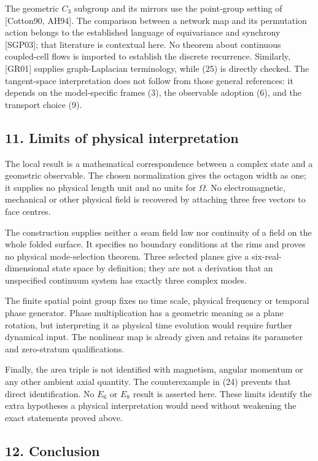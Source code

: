 \documentclass[
  11pt,
  a4paper,
]{article}
\begin{document}
The geometric \(C_3\) subgroup and its mirrors use the point-group setting of {[}Cotton90, AH94{]}. The comparison between a network map and its permutation action belongs to the established language of equivariance and synchrony {[}SGP03{]}; that literature is contextual here. No theorem about continuous coupled-cell flows is imported to establish the discrete recurrence. Similarly, {[}GR01{]} supplies graph-Laplacian terminology, while (25) is directly checked. The tangent-space interpretation does not follow from those general references: it depends on the model-specific frames (3), the observable adoption (6), and the transport choice (9).

\subsection{11. Limits of physical interpretation}\label{limits-of-physical-interpretation}

The local result is a mathematical correspondence between a complex state and a geometric observable. The chosen normalization gives the octagon width as one; it supplies no physical length unit and no units for \(\Omega\). No electromagnetic, mechanical or other physical field is recovered by attaching three free vectors to face centres.

The construction supplies neither a seam field law nor continuity of a field on the whole folded surface. It specifies no boundary conditions at the rims and proves no physical mode-selection theorem. Three selected planes give a six-real-dimensional state space by definition; they are not a derivation that an unspecified continuum system has exactly three complex modes.

The finite spatial point group fixes no time scale, physical frequency or temporal phase generator. Phase multiplication has a geometric meaning as a plane rotation, but interpreting it as physical time evolution would require further dynamical input. The nonlinear map is already given and retains its parameter and zero-stratum qualifications.

Finally, the area triple is not identified with magnetism, angular momentum or any other ambient axial quantity. The counterexample in (24) prevents that direct identification. No \(E_6\) or \(E_8\) result is asserted here. These limits identify the extra hypotheses a physical interpretation would need without weakening the exact statements proved above.

\subsection{12. Conclusion}\label{conclusion}
\end{document}
